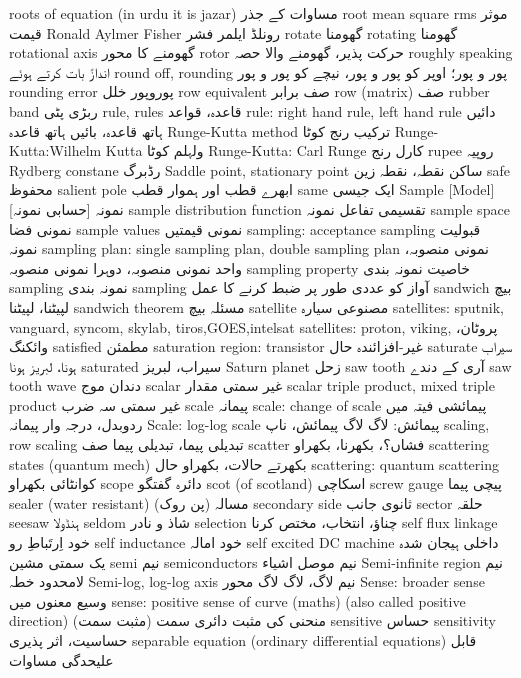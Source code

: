 roots of equation (in urdu it is jazar)	مساوات کے جذر
root mean square rms	موثر قیمت
Ronald Aylmer Fisher	رونلڈ ایلمر فشر
rotate	گھومنا
rotating	گھومنا
rotational axis	گھومنے کا محور
rotor	حرکت پذیر، گھومنے والا حصہ
roughly speaking	اندازً بات کرتے ہوئے
round off, rounding	پور و پور؛ اوپر کو پور و پور، نیچے کو پور و پور
rounding error	پوروپور خلل
row equivalent	صف برابر
row (matrix)	صف
rubber band	ربڑی پٹی
rule, rules	قاعدہ، قواعد
rule: right hand rule, left hand rule	دائیں ہاتھ قاعدہ، بائیں ہاتھ قاعدہ
Runge-Kutta method	ترکیب رنج کوٹا
Runge-Kutta:Wilhelm Kutta	ولہلم کوٹا
Runge-Kutta: Carl Runge	کارل رنج
rupee	روپیہ
Rydberg constane	رڈبرگ
Saddle point, stationary point	ساکن نقطہ، نقطہ زین
safe	محفوظ
salient pole	ابھرے قطب اور ہموار قطب
same	ایک جیسی
Sample  [Model]	نمونہ [حسابی نمونہ]
sample distribution function	تقسیمی تفاعل نمونہ
sample space	نمونی فضا
sample values	نمونی قیمتیں
sampling: acceptance sampling	قبولیت نمونہ
sampling plan: single sampling plan, double sampling plan	نمونی منصوبہ، واحد نمونی منصوبہ، دوہرا نمونی منصوبہ
sampling property	خاصیت نمونہ بندی
sampling	نمونہ بندی
sampling	آواز کو عددی طور پر ضبط کرنے کا عمل
sandwich	بیچ لپیٹنا، لپیٹنا
sandwich theorem	مسئلہ بیچ
satellite	مصنوعی سیارہ
satellites: sputnik, vanguard, syncom, skylab, tiros,GOES,intelsat	
satellites: proton, viking,	پروٹان، وائکنگ
satisfied	مطمئن
saturation region: transistor	غیر-افزائندہ حال
saturate	سیراب ہونا، لبریز ہونا 
saturated	سیراب، لبریز 
Saturn planet	زحل
saw tooth	آری کے دندے
saw tooth wave	دندان موج
scalar	غیر سمتی مقدار
scalar triple product, mixed triple product	غیر سمتی سہ ضرب
scale	پیمانہ
scale: change of scale	پیمائشی فیتہ میں ردوبدل، درجہ وار پیمانہ
Scale: log-log scale	پیمائش: لاگ لاگ پیمائش، ناپ
scaling, row scaling	تبدیلی پیما، تبدیلی پیما صف
scatter	فشاں؟، بکھرنا، بکھراو
scattering states (quantum mech)	بکھرتے حالات، بکھراو حال
scattering: quantum scattering	کوانٹائی بکھراو
scope	دائرہ گفتگو
scot (of scotland)	اسکاچی
screw gauge	پیچی پیما
sealer (water resistant)	مسالہ (پن روک)
secondary side	ثانوی جانب
sector	حلقہ
seesaw	ہنڈولا
seldom	شاذ و نادر
selection	چناؤ، انتخاب، مختص کرنا
self flux linkage	خود اِرتَباطِ رو
self inductance	خود امالہ
self excited DC machine	داخلی ہیجان شدہ یک سمتی مشین
semi	نیم
semiconductors	نیم موصل اشیاء
Semi-infinite region	نیم لامحدود خطہ
Semi-log, log-log axis	نیم لاگ، لاگ لاگ محور
Sense: broader sense	وسیع معنوں میں
sense: positive sense of curve (maths) (also called positive direction)	منحنی کی مثبت دائری سمت (مثبت سمت)
sensitive	حساس
sensitivity	حساسیت، اثر پذیری
separable equation (ordinary differential equations)	قابل علیحدگی مساوات
